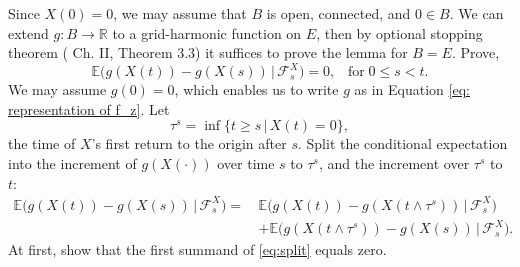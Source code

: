 \documentclass[11pt]{article}
\makeatletter
\renewenvironment{proof}[1][\proofname]{
   \par\pushQED{\qed}\normalfont
   \topsep6\p@\@plus6\p@\relax
   \trivlist\item[\hskip\labelsep\bfseries#1\@addpunct{.}]
   \ignorespaces
}{
   \popQED\endtrivlist\@endpefalse
}
\numberwithin{equation}{section}
\def\Ex{\mathbb{E}}
\def\mydot{\boldsymbol{\cdot}}
\makeatother
\begin{document}
\begin{proof}[Proof of Lemma \ref{L: harmonic on cross}]
  \renewcommand{\qedsymbol}{}
  Since $X(0) = 0$, we may assume 
  that $B$ is open, connected, 
  and $0 \in B$. 
  We can extend $g: B \rightarrow \mathbb{R}$
  to a grid-harmonic function on $E$, 
  then by optional stopping theorem 
  (\cite{revuz} Ch. II, Theorem 3.3) it suffices 
  to prove the lemma for $B=E$. 
  Prove,
  \begin{equation}\nonumber
  \Ex \big( g(X(t)) - g(X(s)) 
  \,\big|\, \mathcal{F}^X_s \big) = 0,
  \;\;\;\text{for} \; 0 \leq s < t.
  \end{equation}
  We may assume $g(0)=0$, which enables us to write $g$ as in 
  Equation \eqref{eq: representation of f_z}. Let
  $$
  \tau^s = \inf \{ t \geq s \,|\, X(t) = 0 \},
  $$
  the time of $X$'s  first return to the origin after $s$.
  Split the conditional expectation into the increment 
  of $g(X(\mydot))$ over time $s$ to $\tau^s$,
  and the increment over $\tau^s$ to $t$: 
  \begin{equation} \label{eq:split}
    \begin{split}
      \Ex \big( g(X(t)) - g(X(s)) \,\big|\, \mathcal{F}^X_s \big) 
    = \, & \Ex 
    \big( g(X(t)) - g(X(t \land \tau^s)) 
          \,\big|\, \mathcal{F}^X_s \big)\\
      & + \Ex \big( g(X(t \land \tau^s))- g(X(s)) 
        \,\big|\, \mathcal{F}^X_s \big).
    \end{split}
  \end{equation}
  At first, show that the first summand of 
  \eqref{eq:split} equals zero.


\end{proof}
\end{document}

